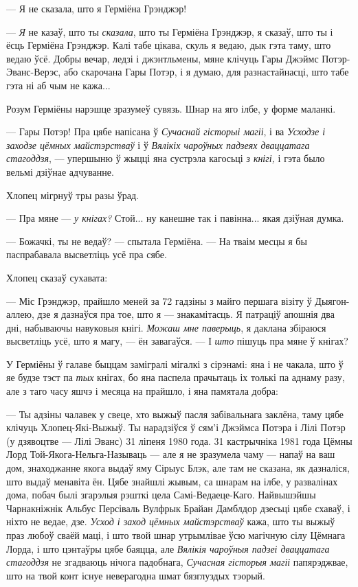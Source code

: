 --- Я не сказала, што я Герміёна Грэнджэр!

--- \emph{Я} не казаў, што ты \emph{сказала}, што ты Герміёна Грэнджэр, я сказаў,
што ты і ёсць Герміёна Грэнджэр. Калі табе цікава, скуль я ведаю, дык гэта таму, што 
ведаю ўсё. Добры вечар, ледзі і джэнтльмены, мяне клічуць Гары Джэймс Потэр-Эванс-Верэс,
або скарочана Гары Потэр, і я думаю, для разнастайнасці, што табе гэта ні аб чым не кажа...

Розум Герміёны нарэшце зразумеў сувязь. Шнар на яго ілбе, у форме маланкі.

--- Гары Потэр! Пра цябе напісана ў \emph{Сучаснай гісторыі магіі}, і ва 
\emph{Усходзе і заходзе цёмных майстэрстваў} і ў 
\emph{Вялікіх чароўных падзеях дваццатага стагоддзя}, --- упершыню ў жыцці яна 
сустрэла кагосьці  \emph{з кнігі,} і гэта было вельмі дзіўнае адчуванне. 

Хлопец мігрнуў тры разы ўрад. 

--- Пра мяне ---  \emph{у кнігах?} Стой... ну канешне так і павінна... якая дзіўная 
думка.

--- Божачкі, ты не ведаў? --- спытала Герміёна. --- На тваім месцы я бы паспрабавала
высветліць усё пра сябе.

Хлопец сказаў сухавата:

--- Міс Грэнджэр, прайшло меней за 72 гадзіны з майго першага візіту ў 
Дыягон-аллею, дзе я дазнаўся пра тое, што я --- знакамітасць. Я патраціў 
апошнія два дні, набываючы навуковыя кнігі. \emph{Можаш мне паверыць},
я даклана збіраюся высветліць усё, што я магу, --- ён завагаўся. --- І 
\emph{што} пішуць пра мяне ў кнігах?

У Герміёны ў галаве быццам замігралі мігалкі з сірэнамі: яна і не чакала, што 
ў яе будзе тэст па \emph{тых} кнігах, бо яна паспела прачытаць іх 
толькі па аднаму разу, але з таго часу яшчэ і месяца на прайшло, і яна памятала 
добра:

--- Ты адзіны чалавек у свеце, хто выжыў пасля забівальнага заклёна, таму цябе 
клічуць Хлопец-Які-Выжыў. Ты нарадзіўся ў сям'і Джэймса Потэра і Лілі Потэр (у
дзявоцтве --- Лілі Эванс) 31 ліпеня 1980 года. 31 кастрычніка 1981 года 
Цёмны Лорд Той-Якога-Нельга-Называць --- але я не зразумела чаму --- напаў на 
ваш дом, знаходжанне якога выдаў яму Сірыус Блэк, але там не сказана, як дазналіся,
што выдаў менавіта ён. Цябе знайшлі жывым, са шнарам на ілбе, у развалінах дома, 
побач былі згарэлыя рэшткі цела Самі-Ведаеце-Каго. Найвышэйшы Чарнакніжнік Альбус Персіваль
Вулфрык Брайан Дамблдор дзесьці цябе схаваў, і ніхто не ведае, дзе.  
\emph{Усход і заход цёмных майстэрстваў} кажа, што ты выжыў праз любоў сваёй маці,
і што твой шнар утрымлівае ўсю магічную сілу Цёмнага Лорда, і што цэнтаўры цябе 
баяцца, але \emph{Вялікія чароўныя падзеі дваццатага стагоддзя} не згадваюць
нічога падобнага, \emph{Сучасная гісторыя магіі} папярэджвае, што 
на твой конт існуе неверагодна шмат бязглуздых тэорый.

